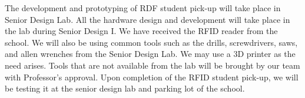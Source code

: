 \quad \quad The development and prototyping of RDF student pick-up will take place 
in Senior Design Lab. All the hardware design and development will take place in the 
lab during Senior Design I. We have received the RFID reader from the school. 
We will also be using common tools such as the drills, screwdrivers, saws, and allen 
wrenches from the Senior Design Lab. We may use a 3D printer as the need arises. 
Tools that are not available from the lab will be brought by our team with Professor's 
approval. Upon completion of the RFID student pick-up, we will be testing it at the 
senior design lab and parking lot of the school. 
